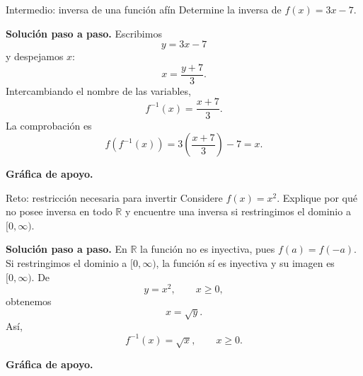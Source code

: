 \documentclass[aspectratio=169,10pt]{beamer}
\newcommand{\R}{\mathbb{R}}
\begin{document}
\begin{frame}{Intermedio: inversa de una función afín}
Determine la inversa de $f(x)=3x-7$.

\textbf{Solución paso a paso.} Escribimos
\[
y=3x-7
\]
y despejamos $x$:
\[
x=\frac{y+7}{3}.
\]
Intercambiando el nombre de las variables,
\[
\boxed{f^{-1}(x)=\frac{x+7}{3}}.
\]
La comprobación es
\[
f(f^{-1}(x))=3\left(\frac{x+7}{3}\right)-7=x.
\]


\textbf{Gráfica de apoyo.}\medskip
\begin{center}
\end{center}

\end{frame}

\begin{frame}{Reto: restricción necesaria para invertir}
Considere $f(x)=x^2$. Explique por qué no posee inversa en todo $\R$ y encuentre una inversa si restringimos el dominio a $[0,\infty)$.

\textbf{Solución paso a paso.} En $\R$ la función no es inyectiva, pues $f(a)=f(-a)$. Si restringimos el dominio a $[0,\infty)$, la función sí es inyectiva y su imagen es $[0,\infty)$. De
\[
y=x^2,\qquad x\ge0,
\]
obtenemos
\[
x=\sqrt{y}.
\]
Así,
\[
\boxed{f^{-1}(x)=\sqrt{x},\qquad x\ge0}.
\]


\textbf{Gráfica de apoyo.}\medskip
\begin{center}
\end{center}

\end{frame}
\end{document}
